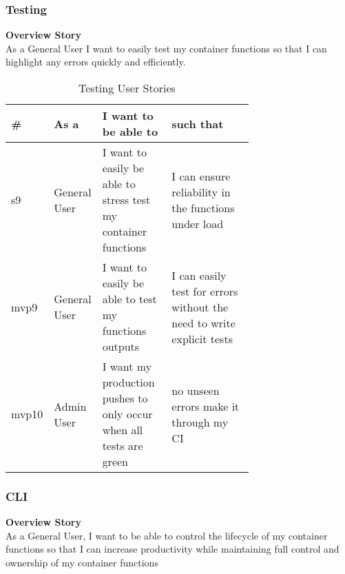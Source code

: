 \documentclass{article}
\begin{document}
\subsubsection{Testing}
\textbf{Overview Story}
\\As a General User I want to easily test my container functions so that I can highlight any errors quickly and efficiently.
\begin{table}[!ht]
\begin{tabular}{|l|l|p{0.3\linewidth}|p{0.4\linewidth}|}
\hline
\textbf{\#} & \textbf{As a} & \textbf{I want to be able to}                                      & \textbf{such that}                                                     \\ \hline
s9          & General User  & I want to easily be able to stress test my container functions     & I can ensure reliability in the functions under load                   \\ \hline
mvp9        & General User  & I want to easily be able to test my functions outputs              & I can easily test for errors without the need to write explicit tests \\ \hline
mvp10        & Admin User    & I want my production pushes to only occur when all tests are green & no unseen errors make it through my CI                                 \\ \hline
\end{tabular}
\caption{Testing User Stories}
\label{tab:test}
\end{table}
\clearpage
\subsubsection{CLI}
\textbf{Overview Story}
\\ As a General User, I want to be able to control the lifecycle of my container functions so that I can increase productivity while maintaining full control and ownership of my container functions
\end{document}
